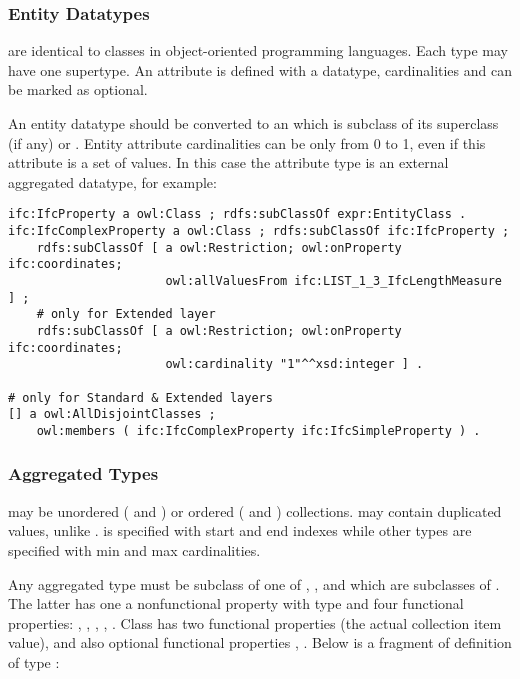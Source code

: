 \subsubsection{Entity Datatypes} are identical to classes in object-oriented programming languages. Each type may have one super\-type. An attribute is defined with a data\-type, cardinalities and can be marked as optional.

\begin{principle}%
An entity data\-type should be converted to an  which is subclass of its superclass (if any) or . Entity attribute cardinalities can be only from 0 to 1, even if this attribute is a set of values. In this case the attribute type is an external aggregated data\-type, for example:

\begin{lstlisting}
ifc:IfcProperty a owl:Class ; rdfs:subClassOf expr:EntityClass .
ifc:IfcComplexProperty a owl:Class ; rdfs:subClassOf ifc:IfcProperty ;
    rdfs:subClassOf [ a owl:Restriction; owl:onProperty ifc:coordinates;
                      owl:allValuesFrom ifc:LIST_1_3_IfcLengthMeasure ] ;
    # only for Extended layer
    rdfs:subClassOf [ a owl:Restriction; owl:onProperty ifc:coordinates;
                      owl:cardinality "1"^^xsd:integer ] .

# only for Standard & Extended layers
[] a owl:AllDisjointClasses ;
    owl:members ( ifc:IfcComplexProperty ifc:IfcSimpleProperty ) .
\end{lstlisting}
\end{principle}


\subsubsection{Aggregated Types} may be unordered ( and ) or  ordered ( and ) collections.  may contain duplicated values, unlike .  is specified with start and end indexes while other types are specified with min and max cardinalities.

\begin{principle}Any aggregated type must be subclass of one of , ,  and  which are subclasses of . The latter has one a nonfunctional property  with type  and four functional properties: , , , , . Class  has two functional properties  (the actual collection item value),  and also optional functional properties , . Below is a fragment of definition of type :
\end{principle}

